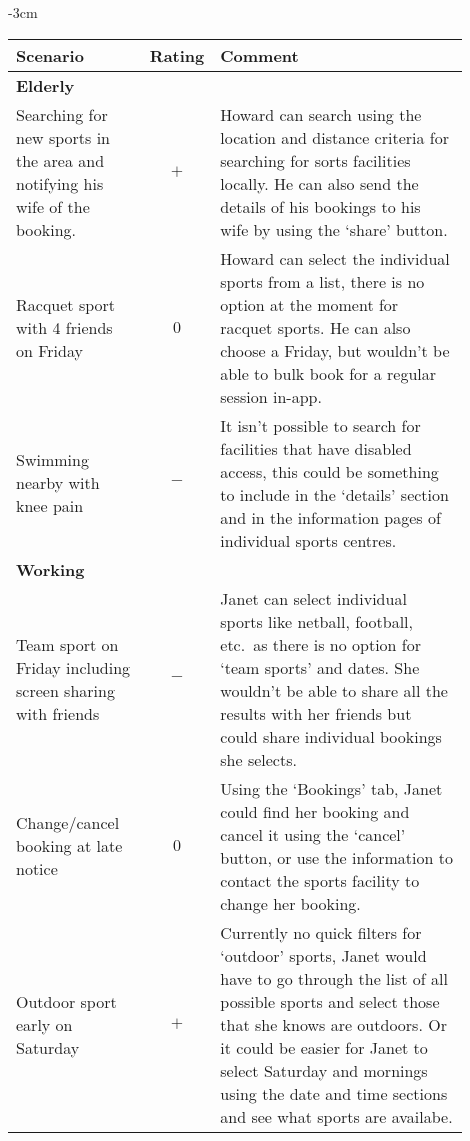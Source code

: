 \begin{center}
	\begin{adjustwidth*}{}{-3cm}
	\renewcommand{\arraystretch}{2}
	\begin{longtable}{@{\extracolsep{\fill}}p{0.3\linewidth} c p{0.6\linewidth}}
		\toprule
		\textbf{Scenario} & \textbf{Rating} & \textbf{Comment}\\
		\midrule
		\midrule
		\multicolumn{3}{l}{\textbf{Elderly}}\\
		\cmidrule(r){1-3}
		Searching for new sports in the area and notifying
		his wife of the booking. & $+$ & Howard can search using the location and
		distance criteria for searching for sorts facilities locally. He can
		also send the details of his bookings to his wife by using the `share'
		button.\\

		Racquet sport with 4 friends on Friday & $0$ & Howard can select the
		individual sports from a list, there is no option at the moment for
		racquet sports. He can also choose a Friday, but wouldn't be able to
		bulk book for a regular session in-app.\\

		Swimming nearby with knee pain & $-$ & It isn't possible to search
		for facilities that have disabled access, this could be something to
		include in the `details' section and in the information pages of
		individual sports centres.\\

		\midrule
		\multicolumn{3}{l}{\textbf{Working}}\\
		\cmidrule(r){1-3}
		Team sport on Friday including screen sharing with friends& $-$ & Janet
		can select individual sports like netball, football, etc.\  as there is
		no option for `team sports' and dates. She wouldn't be able to share
		all the results with her friends but could share individual bookings
		she selects.\\

		Change/cancel booking at late notice & $0$ & Using the `Bookings'
		tab, Janet could find her booking and cancel it using the `cancel'
		button, or use the information to contact the sports facility to change
		her booking.\\

		Outdoor sport early on Saturday & $+$ & Currently no quick filters
		for `outdoor' sports, Janet would have to go through the list of all
		possible sports and select those that she knows are outdoors.  Or it
		could be easier for Janet to select Saturday and mornings using the
		date and time sections and see what sports are availabe.\\


\end{longtable}
\end{adjustwidth*}
\end{center}
